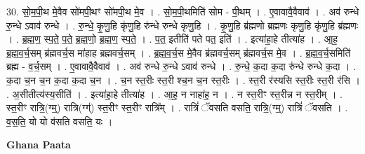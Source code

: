 \documentclass[17pt]{extarticle}
\begin{document}
30. सो॒म॒पी॒थ मे॒वैव सो॑मपी॒थꣳ सो॑मपी॒थ मे॒व । . सो॒म॒पी॒थमिति॑ सोम - पी॒थम् । . ए॒वावावै॒वैवाव॑ । . अव॑ रुन्धे रु॒न्धे ऽवाव॑ रुन्धे । . रु॒न्धे॒ कृ॒णु॒हि कृ॑णु॒हि रु॑न्धे रुन्धे कृणु॒हि । . कृ॒णु॒हि ब्र॑ह्मणो ब्रह्मणः कृणु॒हि कृ॑णु॒हि ब्र॑ह्मणः । . ब्र॒ह्म॒ण॒ स्प॒ते॒ प॒ते॒ ब्र॒ह्म॒णो॒ ब्र॒ह्म॒ण॒ स्प॒ते॒ । . प॒त॒ इतीति॑ पते पत॒ इति॑ । . इत्या॑हा॒हे तीत्या॑ह । . आ॒ह॒ ब्र॒ह्म॒व॒र्च॒सम् ब्र॑ह्मवर्च॒स मा॑हाह ब्रह्मवर्च॒सम् । . ब्र॒ह्म॒व॒र्च॒स मे॒वैव ब्र॑ह्मवर्च॒सम् ब्र॑ह्मवर्च॒स मे॒व । . ब्र॒ह्म॒व॒र्च॒समिति॑ ब्रह्म - व॒र्च॒सम् । . ए॒वावावै॒वैवाव॑ । . अव॑ रुन्धे रु॒न्धे ऽवाव॑ रुन्धे । . रु॒न्धे॒ क॒दा क॒दा रु॑न्धे रुन्धे क॒दा । . क॒दा च॒न च॒न क॒दा क॒दा च॒न । . च॒न स्त॒रीः स्त॒री श्च॒न च॒न स्त॒रीः । . स्त॒री र॑स्यसि स्त॒रीः स्त॒री र॑सि । . अ॒सीतीत्य॑स्य॒सीति॑ । . इत्या॑हा॒हे तीत्या॑ह । . आ॒ह॒ न नाहा॑ह॒ न । . न स्त॒रीꣳ स्त॒रीन्न न स्त॒रीम् । . स्त॒रीꣳ रात्रि॒(ग्म्॒) रात्रि(ग्ग्॑) स्त॒रीꣳ स्त॒रीꣳ रात्रि᳚म् । . रात्रिं॑ ॅवसति वसति॒ रात्रि॒(ग्म्॒) रात्रिं॑ ॅवसति । . व॒स॒ति॒ यो यो व॑सति वसति॒ यः । \newline

\textbf{Ghana Paata } \newline
\end{document}
